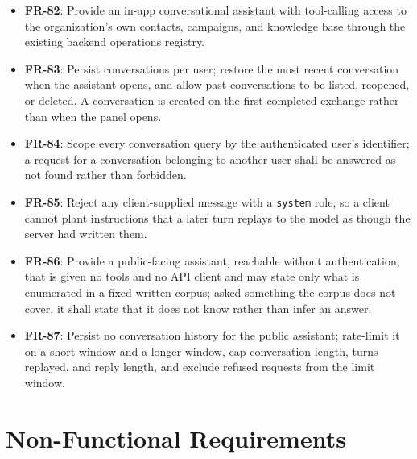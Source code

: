 \documentclass[a4paper]{article}
\begin{document}
\begin{itemize}
    \item \textbf{FR-82}: Provide an in-app conversational assistant
    with tool-calling access to the organization's own contacts,
    campaigns, and knowledge base through the existing backend
    operations registry.
    \item \textbf{FR-83}: Persist conversations per user; restore the
    most recent conversation when the assistant opens, and allow past
    conversations to be listed, reopened, or deleted. A conversation
    is created on the first completed exchange rather than when the
    panel opens.
    \item \textbf{FR-84}: Scope every conversation query by the
    authenticated user's identifier; a request for a conversation
    belonging to another user shall be answered as not found rather
    than forbidden.
    \item \textbf{FR-85}: Reject any client-supplied message with a
    \texttt{system} role, so a client cannot plant instructions that a
    later turn replays to the model as though the server had written
    them.
    \item \textbf{FR-86}: Provide a public-facing assistant, reachable
    without authentication, that is given no tools and no API client
    and may state only what is enumerated in a fixed written corpus;
    asked something the corpus does not cover, it shall state that it
    does not know rather than infer an answer.
    \item \textbf{FR-87}: Persist no conversation history for the
    public assistant; rate-limit it on a short window and a longer
    window, cap conversation length, turns replayed, and reply length,
    and exclude refused requests from the limit window.
\end{itemize}


\newpage
\section{Non-Functional Requirements}
\label{appendix:non-functional-requirements}
\end{document}
